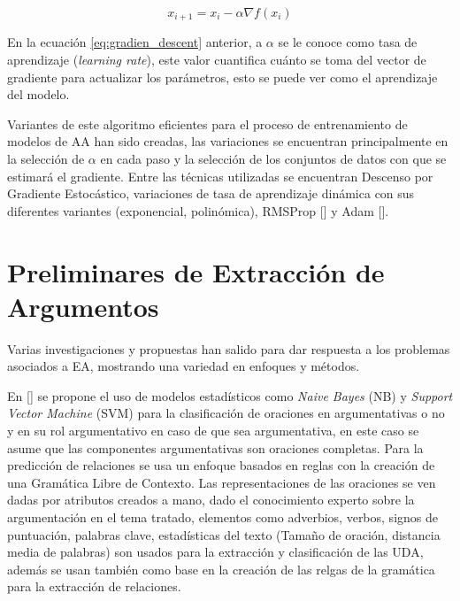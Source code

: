 \begin{equation}
	x_{i+1} = x_i - \alpha \nabla f(x_i)
\end{equation}\label{eq:gradien_descent}

En la ecuación \ref{eq:gradien_descent} anterior, a $\alpha$ se le conoce como tasa de aprendizaje (\emph{learning rate}),
este valor cuantifica cuánto se toma del vector de gradiente para actualizar los parámetros, esto 
se puede ver como el aprendizaje del modelo.

Variantes de este algoritmo eficientes para el proceso de entrenamiento de modelos de AA han sido 
creadas, las variaciones se encuentran principalmente en la selección de $\alpha$ en cada paso y la 
selección de los conjuntos de datos con que se estimará el gradiente. Entre las técnicas utilizadas se 
encuentran Descenso por Gradiente Estocástico, variaciones de tasa de aprendizaje dinámica con 
sus diferentes variantes (exponencial, polinómica), RMSProp [\cite{tieleman2012rmsp}] 
y Adam [\cite{kingma2014adam}].

\section{Preliminares de Extracción de Argumentos}

Varias investigaciones y propuestas han salido para dar respuesta a los problemas asociados a EA, mostrando
una variedad en enfoques y métodos.

En [\cite{palau2009argumentation}] se propone
el uso de modelos estadísticos como \emph{Naive Bayes} (NB) y \emph{Support Vector Machine} (SVM) 
para la clasificación de 
oraciones en argumentativas o no y en su rol argumentativo en caso de que sea argumentativa, en este
caso se asume que las componentes argumentativas son oraciones completas. Para la predicción de relaciones
se usa un enfoque basados en reglas con la creación de una Gramática Libre de Contexto. Las representaciones
de las oraciones se ven dadas por atributos creados a mano, dado el conocimiento experto sobre la argumentación
en el tema tratado, elementos como adverbios, verbos, signos de puntuación, palabras clave, estadísticas del texto
(Tamaño de oración, distancia media de palabras) son usados para la extracción y clasificación de las UDA, además
se usan también como base en la creación de las relgas de la gramática para la extracción de relaciones.

